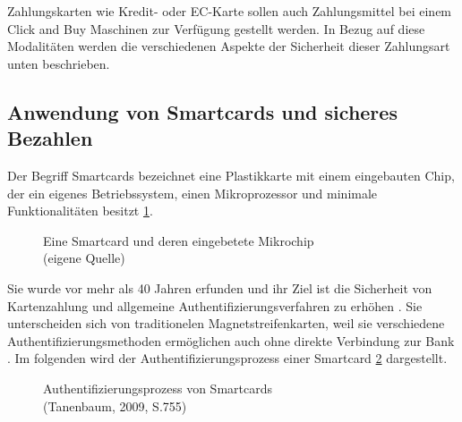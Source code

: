Zahlungskarten wie Kredit- oder EC-Karte sollen auch Zahlungsmittel bei einem Click and Buy Maschinen
zur Verfügung gestellt werden. In Bezug auf diese Modalitäten werden die verschiedenen Aspekte der 
Sicherheit dieser Zahlungsart unten beschrieben.


\subsection{Anwendung von Smartcards und sicheres Bezahlen}
Der Begriff Smartcards bezeichnet eine Plastikkarte mit einem eingebauten Chip, der ein eigenes Betriebssystem,
einen Mikroprozessor und minimale Funktionalitäten besitzt \ref{fig:eigenes_Bild}. 

\vfill
\begin{figure}[htb]
   \caption{Eine Smartcard und deren eingebetete Mikrochip\\(eigene Quelle)}
   \label{fig:eigenes_Bild}
\end{figure}
\vfill

Sie wurde vor mehr als 40 Jahren erfunden und ihr Ziel ist die Sicherheit von Kartenzahlung und allgemeine
Authentifizierungsverfahren zu erhöhen \cite{refip:JFSB}. Sie unterscheiden sich von traditionelen 
Magnetstreifenkarten, weil sie verschiedene Authentifizierungsmethoden ermöglichen auch ohne direkte 
Verbindung zur Bank \cite{refbook:ATMS}. Im folgenden wird der Authentifizierungsprozess
einer Smartcard \ref{fig:refbook_ATMS} dargestellt. 

\vfill
\begin{figure}[htb]
   \caption{Authentifizierungsprozess von Smartcards\\(Tanenbaum, 2009, S.755)}
   \label{fig:refbook_ATMS}
\end{figure}
\vfill



